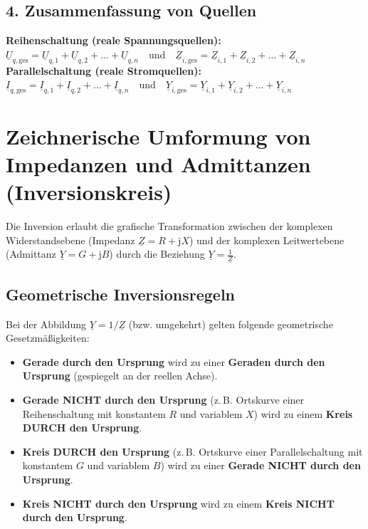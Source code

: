 \documentclass[a4paper,11pt]{article}
\begin{document}
\subsection*{4. Zusammenfassung von Quellen}
\textbf{Reihenschaltung (reale Spannungsquellen):} \\
$\underline{U}_{q,\text{ges}} = \underline{U}_{q,1} + \underline{U}_{q,2} + \dots + \underline{U}_{q,n} \quad \text{und} \quad \underline{Z}_{i,\text{ges}} = \underline{Z}_{i,1} + \underline{Z}_{i,2} + \dots + \underline{Z}_{i,n}$ \\[3mm]
\textbf{Parallelschaltung (reale Stromquellen):} \\
$\underline{I}_{q,\text{ges}} = \underline{I}_{q,1} + \underline{I}_{q,2} + \dots + \underline{I}_{q,n} \quad \text{und} \quad \underline{Y}_{i,\text{ges}} = \underline{Y}_{i,1} + \underline{Y}_{i,2} + \dots + \underline{Y}_{i,n}$

\section{Zeichnerische Umformung von Impedanzen und Admittanzen (Inversionskreis)}

Die Inversion erlaubt die grafische Transformation zwischen der komplexen Widerstandsebene (Impedanz $\underline{Z} = R + \mathrm{j}X$) und der komplexen Leitwertebene (Admittanz $\underline{Y} = G + \mathrm{j}B$) durch die Beziehung $\underline{Y} = \frac{1}{\underline{Z}}$.

\subsection*{Geometrische Inversionsregeln}
Bei der Abbildung $\underline{Y} = 1/\underline{Z}$ (bzw. umgekehrt) gelten folgende geometrische Gesetzmäßigkeiten:
\begin{itemize}
    \item \textbf{Gerade durch den Ursprung} wird zu einer \textbf{Geraden durch den Ursprung} (gespiegelt an der reellen Achse).
    \item \textbf{Gerade NICHT durch den Ursprung} (z.\,B. Ortskurve einer Reihenschaltung mit konstantem $R$ und variablem $X$) wird zu einem \textbf{Kreis DURCH den Ursprung}.
    \item \textbf{Kreis DURCH den Ursprung} (z.\,B. Ortskurve einer Parallelschaltung mit konstantem $G$ und variablem $B$) wird zu einer \textbf{Gerade NICHT durch den Ursprung}.
    \item \textbf{Kreis NICHT durch den Ursprung} wird zu einem \textbf{Kreis NICHT durch den Ursprung}.
\end{itemize}
\end{document}
